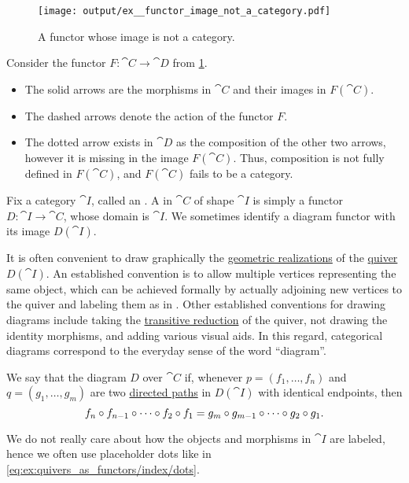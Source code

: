 \begin{example}\label{ex:functor_image_not_a_category}
  \begin{figure}
    \hfill
    \texttt{[image: output/ex\_\_functor\_image\_not\_a\_category.pdf]}
    \hfill
    \hfill
    \caption{A functor whose image is not a category.}\label{fig:ex:functor_image_not_a_category}
  \end{figure}

  Consider the functor \( F: \cat{C} \to \cat{D} \) from \cref{fig:ex:functor_image_not_a_category}.

  \begin{itemize}
    \item The solid arrows are the morphisms in \( \cat{C} \) and their images in \( F(\cat{C}) \).
    \item The dashed arrows denote the action of the functor \( F \).
    \item The dotted arrow exists in \( \cat{D} \) as the composition of the other two arrows, however it is missing in the image \( F(\cat{C}) \). Thus, composition is not fully defined in \( F(\cat{C}) \), and \( F(\cat{C}) \) fails to be a category.
  \end{itemize}
\end{example}

\begin{definition}\label{def:categorical_diagram}
  Fix a category \( \cat{I} \), called an . A  in \( \cat{C} \) of shape \( \cat{I} \) is simply a functor \( D: \cat{I} \to \cat{C} \), whose domain is \( \cat{I} \). We sometimes identify a diagram functor with its image \( D(\cat{I}) \).

  It is often convenient to draw graphically the \hyperref[def:quiver_geometric_realization]{geometric realizations} of the \hyperref[def:quiver]{quiver} \( D(\cat{I}) \). An established convention is to allow multiple vertices representing the same object, which can be achieved formally by actually adjoining new vertices to the quiver and labeling them as in . Other established conventions for drawing diagrams include taking the \hyperref[def:quiver_transitive_closure]{transitive reduction} of the quiver, not drawing the identity morphisms, and adding various visual aids. In this regard, categorical diagrams correspond to the everyday sense of the word \enquote{diagram}.

  We say that the diagram \( D \) over \( \cat{C} \)  if, whenever \( p = (f_1, \ldots, f_n) \) and \( q = (g_1, \ldots, g_m) \) are two \hyperref[def:quiver_path/directed]{directed paths} in \( D(\cat{I}) \) with identical endpoints, then
  \begin{equation*}
    f_n \bincirc f_{n-1} \bincirc \cdots \bincirc f_2 \bincirc f_1
    =
    g_m \bincirc g_{m-1} \bincirc \cdots \bincirc g_2 \bincirc g_1.
  \end{equation*}

  We do not really care about how the objects and morphisms in \( \cat{I} \) are labeled, hence we often use placeholder dots like in \eqref{eq:ex:quivers_as_functors/index/dots}.
\end{definition}

